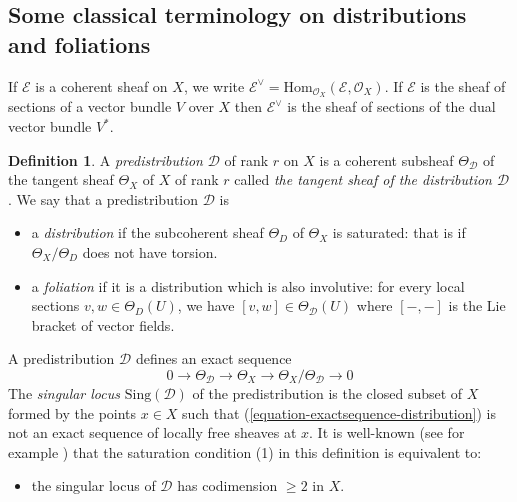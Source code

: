 \documentclass[12pt]{amsart}
\theoremstyle{definition}
\newtheorem{definition}{Definition}[subsection]
\theoremstyle{plain}
\theoremstyle{exampstyle}
\theoremstyle{exampstyle}\newtheorem{thmxbis}{Theorem}
\numberwithin{equation}{section}
\theoremstyle{remark}
\begin{document}
\subsection{Some classical terminology on distributions and foliations} If $\mathcal E$ is a coherent sheaf on $X$, we write $\mathcal E^\vee = \mathrm{Hom}_{\mathcal O_X}(\mathcal E, \mathcal O_X)$. If $\mathcal E$ is the sheaf of sections of a vector bundle $V$ over $X$ then $\mathcal E^\vee$ is the sheaf of sections of the dual vector bundle $V^\ast$.  

\begin{definition} 
A \textit{predistribution} $\mathcal D$ of rank $r$ on $X$ is a coherent subsheaf $\Theta_\mathcal D$ of the tangent sheaf $\Theta_X$ of $X$ of rank $r$ called {\em the tangent sheaf of the distribution $\mathcal D$}. We say that a predistribution $\mathcal D$ is 
\begin{itemize} 
\item[(1)] a \textit{distribution} if the subcoherent sheaf $\Theta_D$ of $\Theta_X$ is saturated: that is if $\Theta_X/\Theta_D$ does not have torsion.
\item[(2)] a \textit{foliation} if it is a distribution which is also involutive: for every local sections $v,w \in \Theta_D(U)$, we have $[v,w] \in \Theta_\mathcal D(U) $ where $[-,-]$ is the Lie bracket of vector fields.  
\end{itemize} 
\end{definition}

A predistribution $\mathcal D$ defines an exact sequence 
\begin{equation} \label{equation-exactsequence-distribution}
0 \rightarrow \Theta_\mathcal D \rightarrow \Theta_X \rightarrow \Theta_X/\Theta_\mathcal D \rightarrow 0
\end{equation}
The {\em singular locus} $\mathrm{Sing}(\mathcal D)$ of the predistribution is the closed subset of $X$ formed by the points $x \in X$ such that (\ref{equation-exactsequence-distribution}) is not an exact sequence of locally free sheaves at $x$. 
It is well-known (see for example \cite[Lemma 2.1.3]{jaoui-Confluentes}) that the saturation condition (1) in this definition is equivalent to: 
\begin{itemize}
\item[(1)'] the singular locus of $\mathcal D$ has codimension $\geq 2$ in $X$.
\end{itemize} 
\end{document}
